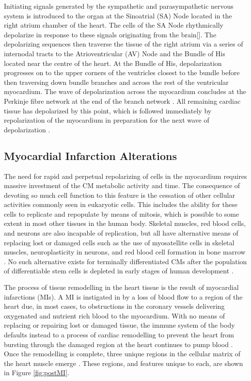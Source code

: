 Initiating signals generated by the sympathetic and parasympathetic nervous system is introduced to the organ at the Sinoatrial (SA) Node located in the right atrium chamber of the heart. The cells of the SA Node rhythmically depolarize in response to these signals originating from the brain[]. The depolarizing sequences then traverse the tissue of the right atrium via a series of internodal tracts to the Atrioventricular (AV) Node and the Bundle of His located near the centre of the heart. At the Bundle of His, depolarization progresses on to the upper corners of the ventricles closest to the bundle before then traversing down bundle branches and across the rest of the ventricular myocardium. The wave of depolarization across the myocardium concludes at the Perkinje fibre network at the end of the branch network \cite{saltzman_biomedical_2015}. All remaining cardiac tissue has depolarized by this point, which is followed immediately by repolarization of the myocardium in preparation for the next wave of depolarization \cite{saltzman_biomedical_2015}.

\subsection{Myocardial Infarction Alterations}

The need for rapid and perpetual repolarizing of cells in the myocardium requires massive investment of the CM metabolic activity and time. The consequence of devoting so much cell function to this feature is the cessation of other cellular activities commonly seen in eukaryotic cells. This includes the ability for these cells to replicate and repopulate by means of mitosis, which is possible to some extent in most other tissues in the human body. Skeletal muscles, red blood cells, and neurons are also incapable of replication, but all have alternative means of replacing lost or damaged cells such as the use of myosatellite cells in skeletal muscles, neuroplasticity in neurons, and red blood cell formation in bone marrow \cite{paxton_leeds_2003}. No such alternative exists for terminally differentiated CMs after the population of differentiable stem cells is depleted in early stages of human development \cite{uygur_mechanisms_2016}. 

 The process of tissue remodelling in the heart tissue is the result of myocardial infarctions (MIs). A MI is instigated in by a loss of blood flow to a region of the heart due, in most cases, to obstructions in the coronary vessels delivering oxygenated and nutrient rich blood to the myocardium. With no means of replacing or repairing lost or damaged tissue, the immune system of the body defaults instead to a process of cardiac remodelling to prevent the heart from bursting through the damaged region at the heart continues to pump blood \cite{huethorst_development_2022}.  Once the remodelling is complete, three unique regions in the cellular matrix of the heart muscle emerge \cite{amoni_heterogeneity_2023}. These regions, and features unique to each, are shown in Figure \ref{fig:postMI}. 

